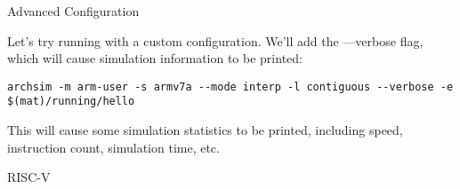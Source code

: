 \begin{frame}[fragile]{Advanced Configuration}

Let's try running with a custom configuration. We'll add the {\ttfamily ---verbose} flag, which will cause simulation information to be printed:

\begin{lstlisting}[basicstyle=\ttfamily\ssmall]
archsim -m arm-user -s armv7a --mode interp -l contiguous --verbose -e $(mat)/running/hello
\end{lstlisting}

This will cause some simulation statistics to be printed, including
speed, instruction count, simulation time, etc.

\end{frame}

\begin{frame}{RISC-V}

\end{frame}

